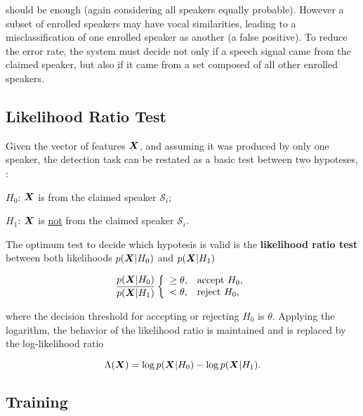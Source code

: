 \noindent should be enough (again considering all speakers equally probable). However a subset of enrolled speakers may have vocal similarities, leading to a misclassification of one enrolled speaker as another (a false positive). To reduce the error rate, the system must decide not only if a speech signal came from the claimed speaker, but also if it came from a set composed of all other enrolled speakers.

\subsection{Likelihood Ratio Test}

Given the vector of features $\boldsymbol{X}$, and assuming it was produced by only one speaker, the detection task can be restated as a basic test between two hypoteses, :

\begin{description}\itemsep0pt
    \item $H_0$: $\boldsymbol{X}$ is from the claimed speaker $\mathcal{S}_i$;
    \item $H_1$: $\boldsymbol{X}$ is \underline{not} from the claimed speaker $\mathcal{S}_i$.
\end{description}

\noindent The optimum test to decide which hypotesis is valid is the \textbf{likelihood ratio test} between both likelihoods $p(\boldsymbol{X}|H_0)$ and $p(\boldsymbol{X}|H_1)$

\begin{equation}
    \frac{\postpdf{\dvec{X}}{H_0}}{\postpdf{\dvec{X}}{H_1}} \verifytestB{\theta}{H_0}
    \label{eq:likelihood-ratio-test}
\end{equation}

\noindent where the decision threshold for accepting or rejecting $H_0$ is $\theta$. Applying the logarithm, the behavior of the likelihood ratio is maintained and  is replaced by the log-likelihood ratio

\begin{equation}
    \Lambda(\dvec{X}) = \log \postpdf{\dvec{X}}{H_0} - \log \postpdf{\dvec{X}}{H_1}.
    \label{eq:log-likelihood-ratio-test}
\end{equation}

\subsection{Training}

